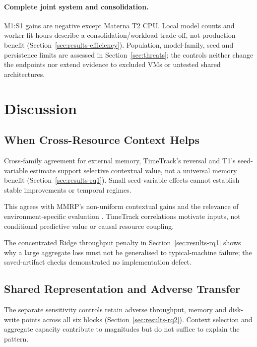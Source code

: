 \documentclass[a4paper,fleqn]{cas-dc}
\begin{document}
\paragraph{Complete joint system and consolidation.}
M1:S1 gains are negative except Materna T2 CPU. Local model counts and worker
fit-hours describe a consolidation/workload trade-off, not production benefit
(Section~\ref{sec:results-efficiency}). Population, model-family, seed and
persistence limits are assessed in Section~\ref{sec:threats}; the controls
neither change the endpoints nor extend evidence to excluded VMs or untested
shared architectures.

\section{Discussion}
\label{sec:discussion}

\subsection{When Cross-Resource Context Helps}
\label{sec:discussion-context}

Cross-family agreement for external memory, TimeTrack's reversal and T1's
seed-variable estimate support selective contextual value, not a universal
memory benefit (Section~\ref{sec:results-rq1}). Small seed-variable effects
cannot establish stable improvements or temporal regimes.

This agrees with MMRP's non-uniform contextual gains \citep{Tripathi2025MMRP}
and the relevance of environment-specific evaluation
\citep{Rossi2025CloudUncertainty}. TimeTrack correlations
\citep{Meliani2025TimeTrack} motivate inputs, not conditional predictive value
or causal resource coupling.

The concentrated Ridge throughput penalty in Section~\ref{sec:results-rq1}
shows why a large aggregate loss must not be generalised to typical-machine
failure; the saved-artifact checks demonstrated no implementation defect.

\subsection{Shared Representation and Adverse Transfer}
\label{sec:discussion-sharing}

The separate sensitivity controls retain adverse throughput, memory and
disk-write points across all six blocks (Section~\ref{sec:results-rq2}).
Context selection and aggregate capacity contribute to magnitudes but do not
suffice to explain the pattern.
\end{document}
